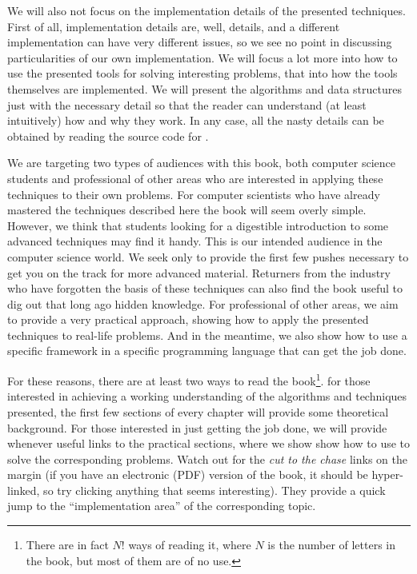 We will also not focus on the implementation details of the 
presented techniques. First of all, implementation details are,
well, details, and a different implementation can have very different
issues, so we see no point in discussing particularities of our
own implementation. We will focus a lot more into how to use the
presented tools for solving interesting problems, that into how the
tools themselves are implemented. We will present
the algorithms and data structures just with the necessary detail
so that the reader can understand (at least intuitively) how and
why they work. In any case, all the nasty details can be obtained by reading
the source code for \sct. 

We are targeting two types of audiences with this book, both computer
science students and professional of other areas who are interested
in applying these techniques to their own problems. For computer scientists
who have already mastered the techniques described here the book will
seem overly simple. However, we think that students looking for a
digestible introduction to some advanced techniques may find it handy.
This is our intended audience in the computer science world. We seek only
to provide the first few pushes necessary to get you on the track for
more advanced material. Returners from the industry who have forgotten the basis of
these techniques can also find the book useful to dig out that
long ago hidden knowledge. 
For professional of other areas, we aim to provide a very practical 
approach, showing how to apply the presented techniques to real-life
problems. And in the meantime, we also show how to use a specific
framework in a specific programming language that can get the job
done.

For these reasons, there are at least two ways to read the book\footnote{There
are in fact $N!$ ways of reading it, where $N$ is the number of letters
in the book, but most of them are of no use.}.
for those interested in achieving a working understanding of the
algorithms and techniques presented, the first few sections of every
chapter will provide some theoretical background. For those interested
in just getting the job done, we will provide whenever useful links
to the practical sections, where we show show how to use \sct to
solve the corresponding problems. Watch out for the \emph{cut to the chase}
links on the margin (if you have an electronic (PDF) version of the book,
it should be hyper-linked, so try clicking anything that seems interesting).
They provide a quick jump to the ``implementation area'' of the corresponding
topic.

